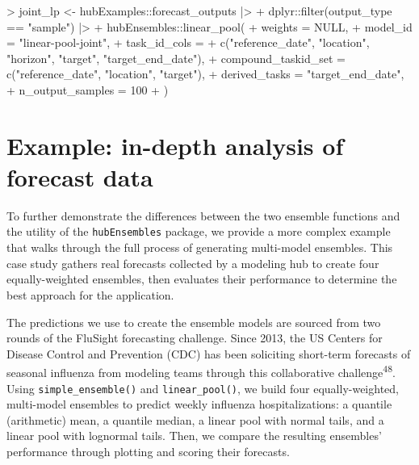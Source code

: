 \documentclass[
  letterpaper,
  DIV=11,
  numbers=noendperiod]{scrartcl}
\newenvironment{Shaded}{\begin{snugshade}}{\end{snugshade}}
\newcommand{\AttributeTok}[1]{\textcolor[rgb]{0.40,0.45,0.13}{#1}}
\newcommand{\ConstantTok}[1]{\textcolor[rgb]{0.56,0.35,0.01}{#1}}
\newcommand{\DecValTok}[1]{\textcolor[rgb]{0.68,0.00,0.00}{#1}}
\newcommand{\FunctionTok}[1]{\textcolor[rgb]{0.28,0.35,0.67}{#1}}
\newcommand{\NormalTok}[1]{\textcolor[rgb]{0.00,0.23,0.31}{#1}}
\newcommand{\OtherTok}[1]{\textcolor[rgb]{0.00,0.23,0.31}{#1}}
\newcommand{\SpecialCharTok}[1]{\textcolor[rgb]{0.37,0.37,0.37}{#1}}
\newcommand{\StringTok}[1]{\textcolor[rgb]{0.13,0.47,0.30}{#1}}
\begin{document}
\begin{Shaded}
\begin{Highlighting}[]
\SpecialCharTok{\textgreater{}}\NormalTok{ joint\_lp }\OtherTok{\textless{}{-}}\NormalTok{ hubExamples}\SpecialCharTok{::}\NormalTok{forecast\_outputs }\SpecialCharTok{|\textgreater{}}
\SpecialCharTok{+}\NormalTok{   dplyr}\SpecialCharTok{::}\FunctionTok{filter}\NormalTok{(output\_type }\SpecialCharTok{==} \StringTok{"sample"}\NormalTok{) }\SpecialCharTok{|\textgreater{}}
\SpecialCharTok{+}\NormalTok{   hubEnsembles}\SpecialCharTok{::}\FunctionTok{linear\_pool}\NormalTok{(}
\SpecialCharTok{+}     \AttributeTok{weights =} \ConstantTok{NULL}\NormalTok{,}
\SpecialCharTok{+}     \AttributeTok{model\_id =} \StringTok{"linear{-}pool{-}joint"}\NormalTok{,}
\SpecialCharTok{+}     \AttributeTok{task\_id\_cols =}
\SpecialCharTok{+}       \FunctionTok{c}\NormalTok{(}\StringTok{"reference\_date"}\NormalTok{, }\StringTok{"location"}\NormalTok{, }\StringTok{"horizon"}\NormalTok{, }\StringTok{"target"}\NormalTok{, }\StringTok{"target\_end\_date"}\NormalTok{),}
\SpecialCharTok{+}     \AttributeTok{compound\_taskid\_set =} \FunctionTok{c}\NormalTok{(}\StringTok{"reference\_date"}\NormalTok{, }\StringTok{"location"}\NormalTok{, }\StringTok{"target"}\NormalTok{),}
\SpecialCharTok{+}     \AttributeTok{derived\_tasks =} \StringTok{"target\_end\_date"}\NormalTok{,}
\SpecialCharTok{+}     \AttributeTok{n\_output\_samples =} \DecValTok{100}
\SpecialCharTok{+}\NormalTok{   )}
\end{Highlighting}
\end{Shaded}

\section{Example: in-depth analysis of forecast
data}\label{sec-case-study}

To further demonstrate the differences between the two ensemble
functions and the utility of the \texttt{hubEnsembles} package, we
provide a more complex example that walks through the full process of
generating multi-model ensembles. This case study gathers real forecasts
collected by a modeling hub to create four equally-weighted ensembles,
then evaluates their performance to determine the best approach for the
application.

The predictions we use to create the ensemble models are sourced from
two rounds of the FluSight forecasting challenge. Since 2013, the US
Centers for Disease Control and Prevention (CDC) has been soliciting
short-term forecasts of seasonal influenza from modeling teams through
this collaborative challenge\textsuperscript{48}. Using
\texttt{simple\_ensemble()} and \texttt{linear\_pool()}, we build four
equally-weighted, multi-model ensembles to predict weekly influenza
hospitalizations: a quantile (arithmetic) mean, a quantile median, a
linear pool with normal tails, and a linear pool with lognormal tails.
Then, we compare the resulting ensembles' performance through plotting
and scoring their forecasts.
\end{document}
